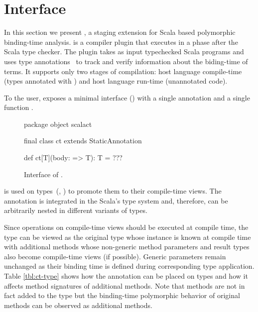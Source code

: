 \section{\tool Interface}
\label{sct:interface}

In this section we present \tool, a staging extension for Scala based polymorphic binding-time analysis.
 \tool is a compiler plugin that executes in a phase after the
 Scala type checker. The plugin takes as input typechecked Scala programs and uses
 type annotations~\cite{odersky_1996_putting} to track and verify information about the biding-time
 of terms. It supports only two stages of compilation: host language compile-time
 (types annotated with ) and host language run-time (unannotated code).

To the user, \tool exposes a minimal interface () with
a single annotation  and a single function .

\begin{figure}
\begin{listing}
package object scalact {
  final class ct extends StaticAnnotation

  def ct[T](body: => T): T = ???
}
\end{listing}
\label{fig:interface}
\caption{Interface of \tool.}
\end{figure}

 is used on types~(\eg,
) to promote them to their compile-time views. The
annotation is integrated in the Scala's type system and, therefore, can be
arbitrarily nested in different variants of types.

Since operations on compile-time views should be executed at compile time, the  type
can be viewed as the original type whose instance is known at compile time with additional
 methods whose non-generic method parameters and result types also become compile-time views (if possible).
 Generic parameters remain unchanged as their binding time is defined during corresponding
 type application. Table \ref{tbl:ct-type} shows how the  annotation can be
 placed on types and how it affects method signatures of additional methods. Note that methods are not
 in fact added to the type but the binding-time polymorphic behavior of original methods can be observed
 as additional methods.

